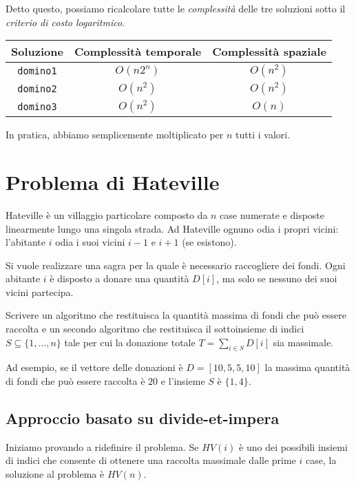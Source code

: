Detto questo, possiamo ricalcolare tutte le \emph{complessità} delle tre soluzioni
sotto il \emph{criterio di costo logaritmico}.

\begin{table}[h!]
    \centering
    \renewcommand{\arraystretch}{1.2}
    \begin{tabular}{|c|c|c|}
        \hline
        \textbf{Soluzione} & \textbf{Complessità temporale} & \textbf{Complessità
        spaziale} \\
        \hline
        \texttt{domino1} & $O(n2^n)$ & $O(n^2)$\\
        \hline
        \texttt{domino2} & $O(n^2)$ & $O(n^2)$\\
        \hline
        \texttt{domino3} & $O(n^2)$ & $O(n)$\\
        \hline
    \end{tabular}
\end{table}
\begin{note}
    In pratica, abbiamo semplicemente moltiplicato per $n$ tutti i valori.
\end{note}

\section{Problema di Hateville}
\begin{problem}[Hateville]
    Hateville è un villaggio particolare composto da $n$ case numerate e
    disposte linearmente lungo una singola strada. Ad Hateville ognuno odia i
    propri vicini: l'abitante $i$ odia i suoi vicini $i-1$ e $i+1$ (se esistono).

    Si vuole realizzare una sagra per la quale è necessario raccogliere dei fondi.
    Ogni abitante $i$ è disposto a donare una quantità $D[i]$, ma solo se nessuno
    dei suoi vicini partecipa.

    Scrivere un algoritmo che restituisca la quantità massima di fondi che può
    essere raccolta e un secondo algoritmo che restituisca il sottoinsieme di
    indici $S\subseteq\{1,\dots,n\}$ tale per cui la donazione totale $T=\sum_{i
    \in S}D[i]$ sia massimale.
\end{problem}\noindent
Ad esempio, se il vettore delle donazioni è $D=[10,5,5,10]$ la massima quantità
di fondi che può essere raccolta è $20$ e l'insieme $S$ è $\{1,4\}$.

\subsection{Approccio basato su divide-et-impera}
Iniziamo provando a ridefinire il problema. Se $HV(i)$ è uno dei possibili
insiemi di indici che consente di ottenere una raccolta massimale dalle prime
$i$ case, la soluzione al problema è $HV(n)$.

